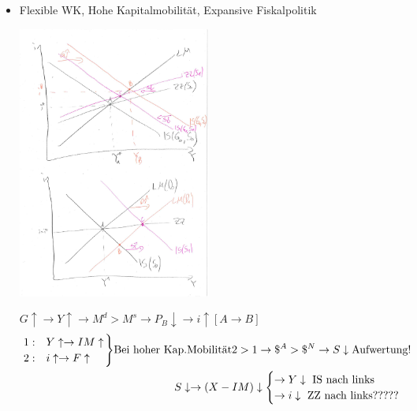 \documentclass{scrartcl}
\newenvironment{rcases}{%
  \left.\renewcommand*\lbrace.%
  \begin{cases}}%
{\end{cases}\right\rbrace}
\begin{document}
\begin{enumerate}[a)]
\begin{itemize}
  \item Flexible WK, Hohe Kapitalmobilit\"{a}t, Expansive Fiskalpolitik
  \begin{center}
  \includegraphics[width=0.5\textwidth]{Bilder/MF4.pdf}
\end{center}
$G\uparrow \rightarrow Y \uparrow \rightarrow M^d>M^s \rightarrow P_B\downarrow \rightarrow i\uparrow [A\rightarrow B]$
\begin{align*}
  \begin{rcases}
  1:& Y \uparrow \rightarrow IM \uparrow\\
  2:& i \uparrow \rightarrow F\uparrow
  \end{rcases}
  \text{Bei hoher Kap.Mobilit\"{a}t} 2>1 \rightarrow \$^{A}>\$^{N} \rightarrow S\downarrow \text{Aufwertung!}\\
  S\downarrow \rightarrow (X-IM)\downarrow
  \begin{cases}
    \rightarrow Y \downarrow \text{ IS nach links}\\
    \rightarrow i \downarrow \text{ ZZ nach links}?????
  \end{cases}
\end{align*}
\end{itemize}


\end{enumerate}
\end{document}
